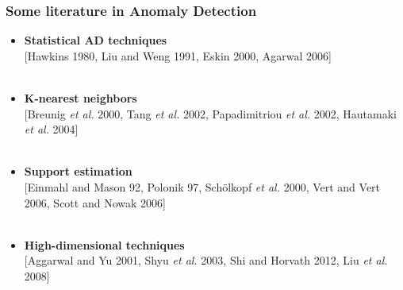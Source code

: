 \documentclass[9pt]{beamer}
\begin{document}
\begin{frame}
\frametitle{Some literature in Anomaly Detection}
\begin{itemize}
\item \textbf{Statistical AD techniques}\\
{\small [Hawkins 1980, Liu and Weng 1991, Eskin 2000, Agarwal 2006]}\\~\\


\item \textbf{K-nearest neighbors}\\
{\small [Breunig \emph{et al.} 2000, Tang \emph{et al.} 2002, Papadimitriou \emph{et al.} 2002, Hautamaki \emph{et al.} 2004]}\\~\\




\item \textbf{Support estimation}\\
{\small [Einmahl and Mason 92, Polonik 97, Sch{\"o}lkopf \emph{et al.} 2000, Vert and Vert 2006, Scott and Nowak 2006]}\\~\\


\item \textbf{High-dimensional techniques}\\
{\small [Aggarwal and Yu 2001, Shyu \emph{et al.} 2003, Shi and Horvath 2012, Liu \emph{et al.} 2008]}


\end{itemize}
\end{frame}
\end{document}
